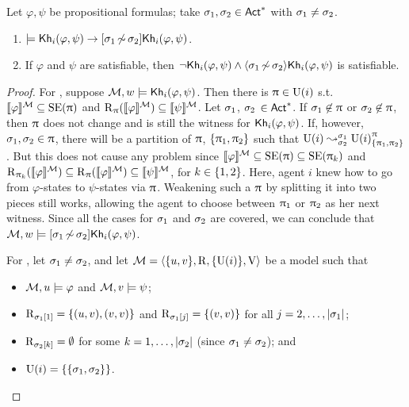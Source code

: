 \begin{proposition}\label{prop:ref-preserves-gains}
Let $\varphi,\psi$ be propositional formulas; take $\plan_1,\plan_2\in\ACT^*$ with $\plan_1\neq\plan_2$.
\begin{enumerate}
\item\label{itm:preservesknowledge} $\models \khi(\varphi,\psi) \ra \refbox{\plan_1}{\plan_2}\khi(\varphi,\psi)$.
\item\label{itm:gainsknowledge} If $\varphi$ and $\psi$ are satisfiable, then $\neg\khi(\varphi,\psi) \wedge \refdiam{\plan_1}{\plan_2}\khi(\varphi,\psi)$ is satisfiable.
\end{enumerate}
\end{proposition}
\begin{proof}
For , suppose $\modults, w \models \khi(\varphi,\psi)$.
Then there is $\plans \in \Unc(i)$ s.t. $\truthset{\modults}{\varphi} \subseteq \stexec(\plans)$ and $\R_\plans(\truthset{\modults}{\varphi}) \subseteq \truthset{\modults}{\psi}$.
Let $\plan_1$, $\plan_2$ $\in \ACT^*$.
If $\plan_1 \not\in \plans$ or $\plan_2 \not\in \plans$, then $\plans$ does not change and is still the witness for $\khi(\varphi,\psi)$.
If, however, $\plan_1,\plan_2 \in \plans$, there will be a partition of $\plans$, $\set{\plans_1,\plans_2}$ such that $\splitstr{\Unc(i)}{\lmodel{\Unc(i)}{\plans}{\set{\plans_1,\plans_2}}}{\plan_1}{\plan_2}$.
But this does not cause any problem since $\truthset{\modults}{\varphi} \subseteq \stexec(\plans) \subseteq \stexec(\plans_k)$ and $\R_{\plans_k}(\truthset{\modults}{\varphi}) \subseteq \R_\plans(\truthset{\modults}{\varphi}) \subseteq \truthset{\modults}{\psi}$, for $k\in\set{1,2}$.
Here, agent $i$ knew how to %
go from $\varphi$-states to $\psi$-states via $\plans$.
Weakening such a $\plans$ by splitting it into two pieces still works, allowing the agent to choose between $\plans_1$ or $\plans_2$ as her next witness.
Since all the cases for $\plan_1$ and $\plan_2$ are covered, we can conclude that $\modults,w\models \refbox{\plan_1}{\plan_2}\khi(\varphi,\psi)$.

For , let $\plan_1 \neq \plan_2$, and let $\modults=\tup{\set{u,v},\R,\set{\Unc(i)},\V}$ be a model such that
\begin{itemize}
\item $\modults,u \models \varphi$ and $\modults,v \models \psi$;
\item $\R_{\plan_1[1]} = \set{(u,v),(v,v)}$ and $\R_{\plan_1[j]} = \set{(v,v)}$ for all $j = 2, \dots, \card{\plan_1}$;
\item $\R_{\plan_2[k]} = \emptyset$ for some $k = 1, \dots, \card{\plan_2}$ (since $\plan_1 \neq \plan_2$); and
\item $\Unc(i) = \set{\set{\plan_1,\plan_2}}$.
\end{itemize}


\end{proof}
